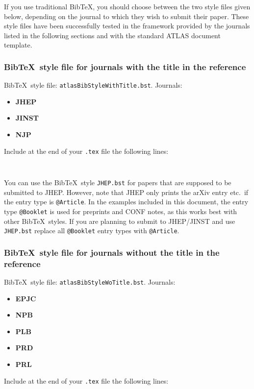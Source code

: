 \documentclass[UKenglish,texlive=2013]{latex/atlasdoc}
\newcommand*{\BibTeX}{Bib\TeX}
\newcommand{\File}[1]{\texttt{#1}\xspace}
\newcommand{\Package}[1]{\texttt{#1}\xspace}
\begin{document}
If you use traditional \BibTeX, you should choose between the two style files given below, 
depending on the journal to which they wish to submit their paper.
These style files have been successfully tested in the framework provided by 
the journals listed in the following sections and with the standard ATLAS document template.


\subsubsection{\BibTeX\ style file for journals with the title in the reference}

\BibTeX\ style file: \Package{atlasBibStyleWithTitle.bst}.
Journals:
\begin{itemize}\setlength{\parskip}{0pt}\setlength{\itemsep}{0pt}
\item \textbf{JHEP}
\item \textbf{JINST}
\item \textbf{NJP}
\end{itemize}
\noindent Include at the end of your \File{.tex} file the following lines:
\begin{verbatim}


\end{verbatim}

You can use the \BibTeX\ style \File{JHEP.bst} for papers that are supposed to be submitted to JHEP.
However, note that JHEP only prints the arXiv entry etc.\ if the entry type is \texttt{@Article}.
In the examples included in this document,
the entry type \texttt{@Booklet} is used for preprints and CONF notes,
as this works best with other \BibTeX\ styles.
If you are planning to submit to JHEP/JINST and use \File{JHEP.bst} 
replace all \texttt{@Booklet} entry types with \texttt{@Article}.


\subsubsection{\BibTeX\ style file for journals without the title in the reference}

\BibTeX\ style file: \Package{atlasBibStyleWoTitle.bst}.
Journals:
\begin{itemize}\setlength{\parskip}{0pt}\setlength{\itemsep}{0pt}
\item \textbf{EPJC}
\item \textbf{NPB}
\item \textbf{PLB}
\item \textbf{PRD}
\item \textbf{PRL}
\end{itemize}
\noindent Include at the end of your \File{.tex} file the following lines:
\begin{verbatim}


\end{verbatim}
\end{document}
